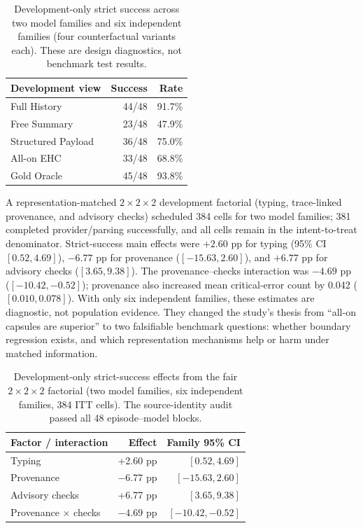 \begin{table}[t]
\centering
\small
\begin{tabular}{@{}lrr@{}}
\toprule
Development view & Success & Rate \\
\midrule
Full History & 44/48 & 91.7\% \\
Free Summary & 23/48 & 47.9\% \\
Structured Payload & 36/48 & 75.0\% \\
All-on EHC & 33/48 & 68.8\% \\
Gold Oracle & 45/48 & 93.8\% \\
\bottomrule
\end{tabular}
\caption{Development-only strict success across two model families and six independent
families (four counterfactual variants each). These are design diagnostics, not
benchmark test results.}
\label{tab:dev-legacy}
\end{table}

A representation-matched $2\!\times\!2\!\times\!2$ development factorial
(typing, trace-linked provenance, and advisory checks) scheduled 384 cells for
two model families; 381 completed provider/parsing successfully, and all cells remain in
the intent-to-treat denominator.  Strict-success main effects were $+2.60$ pp
for typing (95\% CI $[0.52,4.69]$), $-6.77$ pp for provenance
($[-15.63,2.60]$), and $+6.77$ pp for advisory checks
($[3.65,9.38]$).  The provenance--checks interaction was $-4.69$ pp
($[-10.42,-0.52]$); provenance also increased mean critical-error count by
0.042 ($[0.010,0.078]$).  With only six independent families, these
estimates are diagnostic, not population evidence.  They changed the study's
thesis from ``all-on capsules are superior'' to two falsifiable benchmark
questions: whether boundary regression exists, and which representation
mechanisms help or harm under matched information.

\begin{table}[t]
\centering
\small
\begin{tabular}{@{}lrr@{}}
\toprule
Factor / interaction & Effect & Family 95\% CI \\
\midrule
Typing & +2.60 pp & $[0.52,4.69]$ \\
Provenance & $-6.77$ pp & $[-15.63,2.60]$ \\
Advisory checks & +6.77 pp & $[3.65,9.38]$ \\
Provenance $\times$ checks & $-4.69$ pp & $[-10.42,-0.52]$ \\
\bottomrule
\end{tabular}
\caption{Development-only strict-success effects from the fair
$2\times2\times2$ factorial (two model families, six independent families, 384 ITT
cells). The source-identity audit passed all 48 episode--model blocks.}
\label{tab:dev-factorial}
\end{table}

